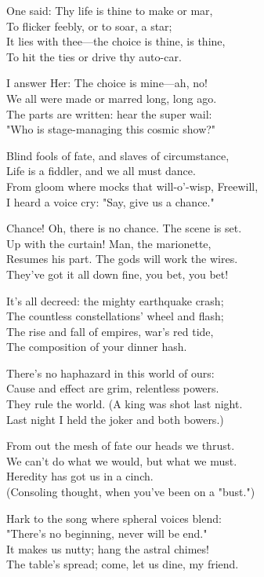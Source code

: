 

\begin{poemblock}
One said: Thy life is thine to make or mar,\\
To flicker feebly, or to soar, a star;\\
It lies with thee—the choice is thine, is thine,\\
To hit the ties or drive thy auto-car.

I answer Her: The choice is mine—ah, no!\\
We all were made or marred long, long ago.\\
The parts are written: hear the super wail:\\
"Who is stage-managing this cosmic show?"

Blind fools of fate, and slaves of circumstance,\\
Life is a fiddler, and we all must dance.\\
From gloom where mocks that will-o'-wisp, Freewill,\\
I heard a voice cry: "Say, give us a chance."

Chance! Oh, there is no chance. The scene is set.\\
Up with the curtain! Man, the marionette,\\
Resumes his part. The gods will work the wires.\\
They've got it all down fine, you bet, you bet!

It's all decreed: the mighty earthquake crash;\\
The countless constellations' wheel and flash;\\
The rise and fall of empires, war's red tide,\\
The composition of your dinner hash.

There's no haphazard in this world of ours:\\
Cause and effect are grim, relentless powers.\\
They rule the world. (A king was shot last night.\\
Last night I held the joker and both bowers.)

From out the mesh of fate our heads we thrust.\\
We can't do what we would, but what we must.\\
Heredity has got us in a cinch.\\
(Consoling thought, when you've been on a "bust.")

Hark to the song where spheral voices blend:\\
"There's no beginning, never will be end."\\
It makes us nutty; hang the astral chimes!\\
The table's spread; come, let us dine, my friend.
\end{poemblock}

